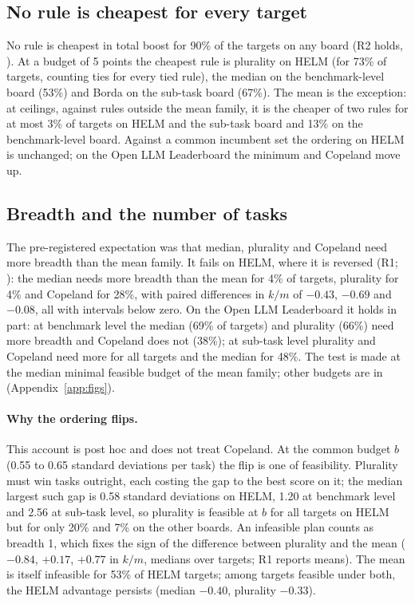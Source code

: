\subsection{No rule is cheapest for every target}
\label{sec:nodominance}

No rule is cheapest in total boost for 90\% of the targets on any board (R2 holds, ). At a budget of 5 points the cheapest rule is plurality on HELM (for 73\% of targets, counting ties for every tied rule), the median on the benchmark-level board (53\%) and Borda on the sub-task board (67\%). The mean is the exception: at ceilings, against rules outside the mean family, it is the cheaper of two rules for at most 3\% of targets on HELM and the sub-task board and 13\% on the benchmark-level board. Against a common incumbent set the ordering on HELM is unchanged; on the Open LLM Leaderboard the minimum and Copeland move up.

\subsection{Breadth and the number of tasks}
\label{sec:breadth}

The pre-registered expectation was that median, plurality and Copeland need more breadth than the mean family. It fails on HELM, where it is reversed (R1; ): the median needs more breadth than the mean for 4\% of targets, plurality for 4\% and Copeland for 28\%, with paired differences in $k/m$ of $-0.43$, $-0.69$ and $-0.08$, all with intervals below zero. On the Open LLM Leaderboard it holds in part: at benchmark level the median (69\% of targets) and plurality (66\%) need more breadth and Copeland does not (38\%); at sub-task level plurality and Copeland need more for all targets and the median for 48\%. The test is made at the median minimal feasible budget of the mean family; other budgets are in  (Appendix~\ref{app:figs}).

\paragraph{Why the ordering flips.}
This account is post hoc and does not treat Copeland. At the common budget $b$ (0.55 to 0.65 standard deviations per task) the flip is one of feasibility. Plurality must win tasks outright, each costing the gap to the best score on it; the median largest such gap is 0.58 standard deviations on HELM, 1.20 at benchmark level and 2.56 at sub-task level, so plurality is feasible at $b$ for all targets on HELM but for only 20\% and 7\% on the other boards. An infeasible plan counts as breadth 1, which fixes the sign of the difference between plurality and the mean ($-0.84$, $+0.17$, $+0.77$ in $k/m$, medians over targets; R1 reports means). The mean is itself infeasible for 53\% of HELM targets; among targets feasible under both, the HELM advantage persists (median $-0.40$, plurality $-0.33$).

